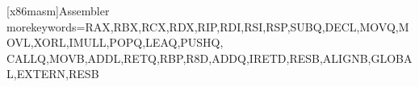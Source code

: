 \newcommand{\tabincell}[2]{\begin{tabular}{@{}#1@{}}#2\end{tabular}}
\newcommand{\tabincelll}[3]{\begin{tabular*}{#1}{@{}#2@{}}#3\end{tabular*}}
\renewcommand{\tabularxcolumn}[1]{m{#1}}
\newcommand{\vil}{\,\vline \hspace{.5em} }


\newcommand{\des}[2]{\makebox[2em][s]{\bf #1}\quad #2}
\newcommand{\function}[5]{\CTEXnoindent\vspace{1em}\par
\begin{minipage}{\textwidth}
    \underline{\makebox[\textwidth][l]{\it{#1}}}\\
    {\tt {{#3}} {\bfseries #1}(#2);}\\
    \des{返回}{#4}\\
    \des{描述}{#5}
\end{minipage}\par
\CTEXindent}

\newcommand\pictext{\linespread{1}\centering}

\makeatletter
{}
\def\lst@SkipToFirst{%
    \lst@ifmatchrangestart\c@lstnumber=\numexpr-1+\lst@firstline\fi
    \ifnum \lst@lineno<\lst@firstline
        \def\lst@next{\lst@BeginDropInput\lst@Pmode
        \lst@Let{13}\lst@MSkipToFirst
        \lst@Let{10}\lst@MSkipToFirst}%
        \expandafter\lst@next
    \else
        \expandafter\lst@BOLGobble
    \fi}
\makeatother


   [x86masm]{Assembler} %
   {morekeywords={RAX,RBX,RCX,RDX,RIP,RDI,RSI,RSP,SUBQ,DECL,MOVQ,MOVL,XORL,IMULL,POPQ,LEAQ,PUSHQ,%
   CALLQ,MOVB,ADDL,RETQ,RBP,R8D,ADDQ,IRETD,RESB,ALIGNB,GLOBAL,EXTERN,RESB}%
} %

